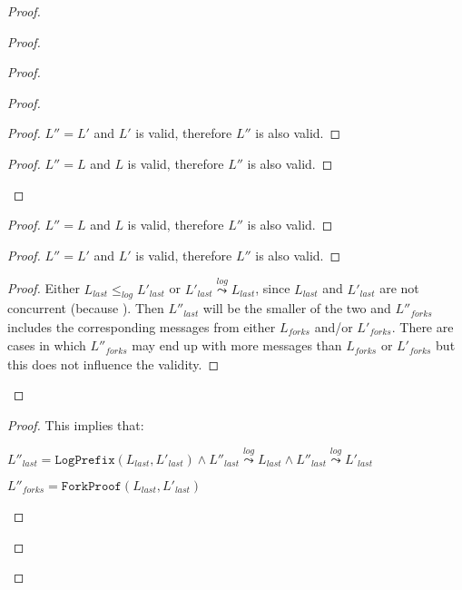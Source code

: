 \documentclass[9pt, oneside]{article}   	%
\newcommand{\logleadsto}{\overset{\textit{log}}\leadsto}
\begin{document}
\begin{proof}
	\begin{proof}
		\begin{proof}
			\begin{proof}
				\begin{proof}
					$L'' = L'$ and $L'$ is valid, therefore $L''$ is also valid.
				\end{proof}
			
				\step{}{\case{$L'_\textit{last} \logleadsto L_\textit{last}$}}
				\begin{proof}
					$L'' = L$ and $L$ is valid, therefore $L''$ is also valid.
				\end{proof}
			\end{proof}
			
			\begin{proof}
				$L'' = L$ and $L$ is valid, therefore $L''$ is also valid.
			\end{proof}
		
			\begin{proof}
				$L'' = L'$ and $L'$ is valid, therefore $L''$ is also valid.
			\end{proof}
		
			\begin{proof}
				Either $L_\textit{last} \leq_\textit{log} L'_\textit{last}$ or $L'_\textit{last} \logleadsto L_\textit{last}$, since $L_\textit{last}$ and $L'_\textit{last}$ are not concurrent (because ). Then $L''_\textit{last}$ will be the smaller of the two and $L''_\textit{forks}$ includes the corresponding messages from either $L_\textit{forks}$ and/or $L'_\textit{forks}$. There are cases in which $L''_\textit{forks}$ may end up with more messages than $L_\textit{forks}$ or $L'_\textit{forks}$ but this does not influence the validity.
			\end{proof}
		\end{proof}

		
	
		\begin{proof}
			This implies that:
			\begin{pfenum}
				\item $L''_\textit{last} = \texttt{LogPrefix}(L_\textit{last},L'_\textit{last}) \wedge L''_\textit{last} \logleadsto L_\textit{last} \wedge  L''_\textit{last} \logleadsto L'_\textit{last}$
				\item $L''_\textit{forks} = \texttt{ForkProof}(L_\textit{last}, L'_\textit{last})$
			\end{pfenum}
			

\end{proof}
\end{proof}
\end{proof}
\end{document}
